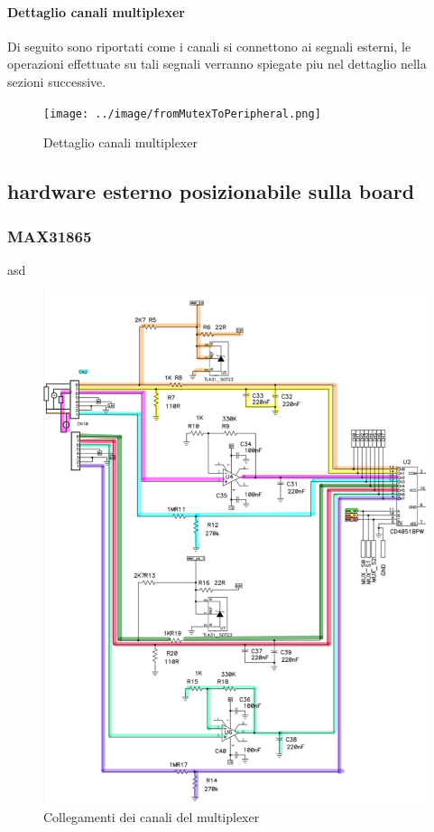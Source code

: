 \documentclass[12pt,a4paper]{report}
\begin{document}
\paragraph{Dettaglio canali multiplexer} 
Di seguito sono riportati come i canali si connettono ai segnali esterni, le operazioni effettuate su tali segnali verranno spiegate piu nel dettaglio nella sezioni successive.

\begin{figure}[H]
    \centering
    \texttt{[image: ../image/fromMutexToPeripheral.png]}
    \caption{Dettaglio canali multiplexer}
\end{figure}

\subsection{ hardware esterno posizionabile sulla board}
\subsubsection{MAX31865}
asd

\begin{figure}[H]
    \centering
    \includegraphics[width=\linewidth]{../image/channelMultiplex.png}
    \caption{Collegamenti dei canali del multiplexer}
\end{figure}
\end{document}
